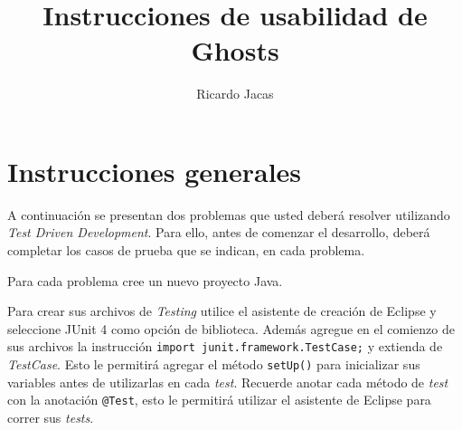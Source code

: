 \documentclass[11pt,spanish,letterpaper]{report}
\title{Instrucciones de usabilidad de Ghosts}
\author{Ricardo Jacas}
\begin{document}
\maketitle

\section*{Instrucciones generales}

A continuación se presentan dos problemas que usted deberá resolver utilizando \textit{Test Driven Development}. Para ello, antes de comenzar el desarrollo, deberá completar los casos de prueba que se indican, en cada problema.

Para cada problema cree un nuevo proyecto Java.

Para crear sus archivos de \textit{Testing} utilice el asistente de creación de Eclipse y seleccione JUnit 4 como opción de biblioteca. Además agregue en el comienzo de sus archivos la instrucción \verb|import junit.framework.TestCase;| y extienda de \textit{TestCase}. Esto le permitirá agregar el método \verb|setUp()| para inicializar sus variables antes de utilizarlas en cada \textit{test}. Recuerde anotar cada método de \textit{test} con la anotación \verb|@Test|, esto le permitirá utilizar el asistente de Eclipse para correr sus \textit{tests}.    
\end{document}
